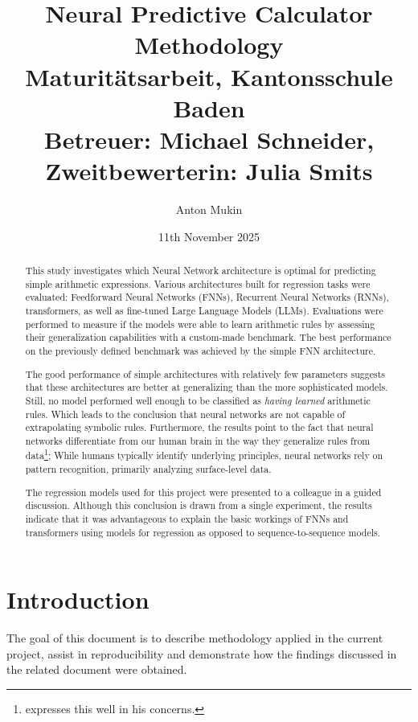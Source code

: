 \documentclass{article}
\title{\huge Neural Predictive Calculator
\\[0em]
{\LARGE Methodology}
\\[0em]
{\large Maturitätsarbeit, Kantonsschule Baden}
\\[-0.5em]
{\large Betreuer: Michael Schneider, Zweitbewerterin: Julia Smits}}
\author{Anton Mukin}
\date{11th November 2025}
\begin{document}
\setlength{\droptitle}{-1cm}
\maketitle

\begin{abstract}
    This study investigates which Neural Network architecture is optimal for predicting 
    simple arithmetic expressions. 
    Various architectures built for regression tasks were evaluated: Feedforward Neural Networks (FNNs), Recurrent Neural Networks (RNNs), transformers, 
    as well as fine-tuned Large Language Models (LLMs). Evaluations were performed to measure 
    if the models were able to learn arithmetic rules by assessing their generalization 
    capabilities with a custom-made benchmark. The best performance on the previously 
    defined benchmark was achieved by the simple FNN architecture.

    The good performance of simple architectures with relatively few parameters suggests that 
    these architectures are better at generalizing than the more sophisticated models.
    Still, no model performed well enough to be classified as \textit{having learned} arithmetic rules.
    Which leads to the conclusion that neural networks are not capable of extrapolating symbolic rules.
    Furthermore, the results point to the fact that neural networks differentiate from our human brain in the way they generalize rules from data\footnote{\cite{marcus2018deeplearningcriticalappraisal} expresses this well in his concerns.};
    While humans typically identify underlying principles, neural networks rely on pattern recognition, primarily analyzing surface-level data.

    The regression models used for this project were presented to a colleague in a guided discussion. Although this conclusion is drawn from a single experiment, the results indicate that it was advantageous to explain the basic workings of FNNs and transformers using models for regression as opposed to sequence-to-sequence models.


\end{abstract}

\newpage
\tableofcontents
\listoffigures
\newpage

\section{Introduction}
The goal of this document is to describe methodology applied in the current project, assist in reproducibility and demonstrate how the findings discussed in the related document were obtained.
\end{document}

